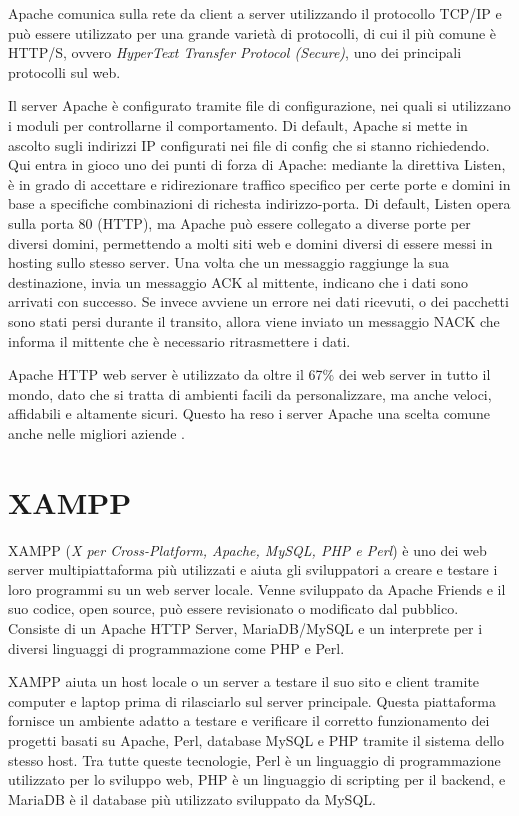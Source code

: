 Apache comunica sulla rete da client a server utilizzando il protocollo TCP/IP e può essere utilizzato per una grande varietà di protocolli, di cui il più comune è HTTP/S, ovvero \textit{HyperText Transfer Protocol (Secure)}, uno dei principali protocolli sul web.

Il server Apache è configurato tramite file di configurazione, nei quali si utilizzano i moduli per controllarne il comportamento. Di default, Apache si mette in ascolto sugli indirizzi IP configurati nei file di config che si stanno richiedendo. Qui entra in gioco uno dei punti di forza di Apache: mediante la direttiva Listen, è in grado di accettare e ridirezionare traffico specifico per certe porte e domini in base a specifiche combinazioni di richesta indirizzo-porta. Di default, Listen opera sulla porta 80 (HTTP), ma Apache può essere collegato a diverse porte per diversi domini, permettendo a molti siti web e domini diversi di essere messi in hosting sullo stesso server. 
Una volta che un messaggio raggiunge la sua destinazione, invia un messaggio ACK al mittente, indicano che i dati sono arrivati con successo. Se invece avviene un errore nei dati ricevuti, o dei pacchetti sono stati persi durante il transito, allora viene inviato un messaggio NACK che informa il mittente che è necessario ritrasmettere i dati.

Apache HTTP web server è utilizzato da oltre il 67\% dei web server in tutto il mondo, dato che si tratta di ambienti facili da personalizzare, ma anche veloci, affidabili e altamente sicuri. Questo ha reso i server Apache una scelta comune anche nelle migliori aziende \cite{Apache}.

\section{XAMPP}
XAMPP (\textit{X per Cross-Platform, Apache, MySQL, PHP e Perl}) è uno dei web server multipiattaforma più utilizzati e aiuta gli sviluppatori a creare e testare i loro programmi su un web server locale. Venne sviluppato da Apache Friends e il suo codice, open source, può essere revisionato o modificato dal pubblico. Consiste di un Apache HTTP Server, MariaDB/MySQL e un interprete per i diversi linguaggi di programmazione come PHP e Perl.

XAMPP aiuta un host locale o un server a testare il suo sito e client tramite computer e laptop prima di rilasciarlo sul server principale. Questa piattaforma fornisce un ambiente adatto a testare e verificare il corretto funzionamento dei progetti basati su Apache, Perl, database MySQL e PHP tramite il sistema dello stesso host. Tra tutte queste tecnologie, Perl è un linguaggio di programmazione utilizzato per lo sviluppo web, PHP è un linguaggio di scripting per il backend, e MariaDB è il database più utilizzato sviluppato da MySQL.

